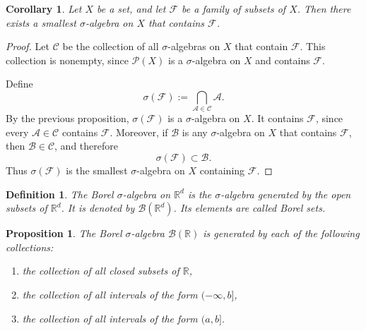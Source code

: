 \documentclass[12pt]{article}
\newtheorem{corollary}{Corollary}
\newtheorem{definition}{Definition}
\newtheorem{proposition}{Proposition}
\begin{document}
\begin{corollary}
Let $X$ be a set, and let $\mathcal{F}$ be a family of subsets of $X$.
Then there exists a smallest $\sigma$-algebra on $X$ that contains $\mathcal{F}$.
\end{corollary}

\begin{proof}
Let $\mathcal{C}$ be the collection of all $\sigma$-algebras on $X$ that contain
$\mathcal{F}$. This collection is nonempty, since $\mathcal{P}(X)$ is a
$\sigma$-algebra on $X$ and contains $\mathcal{F}$.

Define
\[
\sigma(\mathcal{F}) := \bigcap_{\mathcal{A} \in \mathcal{C}} \mathcal{A}.
\]
By the previous proposition, $\sigma(\mathcal{F})$ is a $\sigma$-algebra on $X$.
It contains $\mathcal{F}$, since every $\mathcal{A} \in \mathcal{C}$ contains
$\mathcal{F}$. Moreover, if $\mathcal{B}$ is any $\sigma$-algebra on $X$ that
contains $\mathcal{F}$, then $\mathcal{B} \in \mathcal{C}$, and therefore
\[
\sigma(\mathcal{F}) \subset \mathcal{B}.
\]
Thus $\sigma(\mathcal{F})$ is the smallest $\sigma$-algebra on $X$ containing
$\mathcal{F}$.
\end{proof}

\begin{definition}
The \emph{Borel $\sigma$-algebra} on $\mathbb{R}^d$ is the $\sigma$-algebra
generated by the open subsets of $\mathbb{R}^d$. It is denoted by
$\mathcal{B}(\mathbb{R}^d)$. Its elements are called \emph{Borel sets}.
\end{definition}

\begin{proposition}
The Borel $\sigma$-algebra $\mathcal{B}(\mathbb{R})$ is generated by each of the
following collections:
\begin{enumerate}[label=(\alph*)]
    \item the collection of all closed subsets of $\mathbb{R}$,
    \item the collection of all intervals of the form $(-\infty,b]$,
    \item the collection of all intervals of the form $(a,b]$.
\end{enumerate}
\end{proposition}
\end{document}

